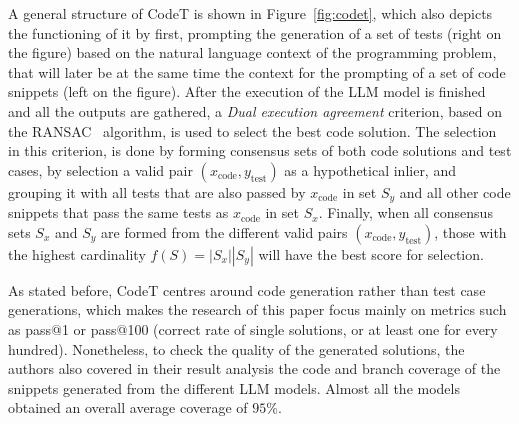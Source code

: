 \documentclass[%
  chapterprefix=false,%
  open=right,%
  twoside=true,%
  paper=a4,%
  logofile={Figures/logo.png},%
  thesistype=master,%
  UKenglish,%
]{se2thesis}
\begin{document}
A general structure of CodeT is shown in Figure~\ref{fig:codet}, which also depicts the functioning of it by first, prompting the generation of a set of tests (right on the figure) based on the natural language context of the programming problem, that will later be at the same time the context for the prompting of a set of code snippets (left on the figure).
After the execution of the LLM model is finished and all the outputs are gathered, a \textit{Dual execution agreement} criterion, based on the RANSAC~\cite{DBLP:journals/cacm/FischlerB81} algorithm, is used to select the best code solution.
The selection in this criterion, is done by forming consensus sets of both code solutions and test cases, by selection a valid pair \((x_\text{code}, y_\text{test})\) as a hypothetical inlier, and grouping it with all tests that are also passed by \(x_\text{code}\) in set \(S_y\) and all other code snippets that pass the same tests as \(x_\text{code}\) in set \(S_x\).
Finally, when all consensus sets \(S_x\) and \(S_y\) are formed from the different valid pairs \((x_\text{code}, y_\text{test})\), those with the highest cardinality \(f(S) = |S_x||S_y|\) will have the best score for selection.

As stated before, CodeT centres around code generation rather than test case generations, which makes the research of this paper focus mainly on metrics such as pass@1 or pass@100 (correct rate of single solutions, or at least one for every hundred).
Nonetheless, to check the quality of the generated solutions, the authors also covered in their result analysis the code and branch coverage of the snippets generated from the different LLM models.
Almost all the models obtained an overall average coverage of \(95\%\).

\backmatter{}

\printbibliography{}
\end{document}
